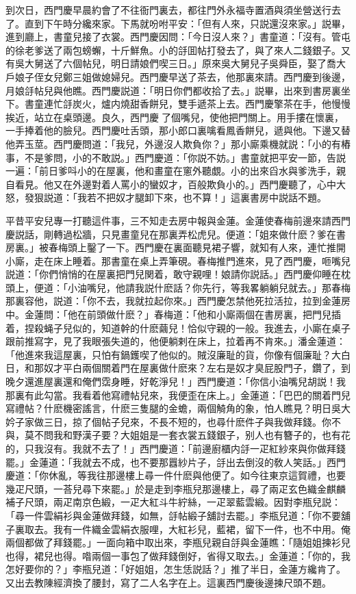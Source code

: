 到次日，西門慶早晨約會了不往衙門裏去，都往門外永福寺置酒與須坐營送行去了。直到下午時分纔來家。下馬就吩咐平安：「但有人來，只説還沒來家。」説畢，進到廳上，書童兒接了衣裳。西門慶因問：「今日沒人來？」書童道：「沒有。管屯的徐老爹送了兩包螃蠏，十斤鮮魚。小的㧱囬帖打發去了，與了來人二錢銀子。又有吳大舅送了六個帖兒，明日請娘們喫三日。」原來吳大舅兒子吳舜臣，娶了喬大戶娘子侄女兒鄭三姐做媳婦兒。西門慶早送了茶去，他那裏來請。西門慶到後邊，月娘㧱帖兒與他瞧。西門慶説道：「明日你們都收拾了去。」説畢，出來到書房裏坐下。書童連忙㧱炭火，爐内燒甜香餅兒，雙手遞茶上去。西門慶擎茶在手，他慢慢挨近，站立在桌頭邊。良久，西門慶𢫓了個嘴兒，使他把門關上。用手摟在懷裏，一手捧着他的臉兒。西門慶吐舌頭，那小郎口裏噙看鳳香餅兒，遞與他。下邊又替他弄玉莖。西門慶問道：「我兒，外邊沒人欺負你？」那小廝乘機就説：「小的有樁事，不是爹問，小的不敢説。」西門慶道：「你説不妨。」書童就把平安一節，告説一遍：「前日爹呌小的在屋裏，他和畫童在窻外聽覷。小的出來舀水與爹洗手，親自看見。他又在外邊對着人罵小的蠻奴才，百般欺負小的。」西門慶聽了，心中大怒，發狠説道：「我若不把奴才腿卸下來，也不算！」這裏書房中説話不題。

平昔平安兒專一打聽這件事，三不知走去房中報與金蓮。金蓮使春梅前邊來請西門慶説話，剛轉過松牆，只見畫童兒在那裏弄松虎兒。便道：「姐來做什麽？爹在書房裏。」被春梅頭上鑿了一下。西門慶在裏面聽見裙子響，就知有人來，連忙推開小廝，走在床上睡着。那書童在桌上弄筆硯。春梅推門進來，見了西門慶，咂嘴兒説道：「你們悄悄的在屋裏把門兒関着，敢守親哩！娘請你説話。」西門慶仰睡在枕頭上，便道：「小油嘴兒，他請我説什麽話？你先行，等我畧躺躺兒就去。」那春梅那裏容他，説道：「你不去，我就拉起你來。」西門慶怎禁他死拉活拉，拉到金蓮房中。金蓮問：「他在前頭做什麽？」春梅道：「他和小廝兩個在書房裏，把門兒插着，捏殺蝇子兒似的，知道幹的什麽繭兒！恰似守親的一般。我進去，小廝在桌子跟前推寫字，見了我眼張失道的，他便躺剌在床上，拉着再不肯來。」潘金蓮道：「他進來我這屋裏，只怕有鍋鑊喫了他似的。賊沒廉耻的貨，你像有個廉耻？大白日，和那奴才平白兩個關着門在屋裏做什麽來？左右是奴才臭屁股門子，鑽了，到晚夕還進屋裏還和俺們霑身睡，好乾淨兒！」西門慶道：「你信小油嘴兒胡説！我那裏有此勾當。我看着他寫禮帖兒來，我便歪在床上。」金蓮道：「巴巴的關着門兒寫禮帖？什麽機密謠言，什麽三隻腿的金蟾，兩個觭角的象，怕人瞧見？明日吳大妗子家做三日，掠了個帖子兒來，不長不短的，也尋什麽件子與我做拜錢。你不與，莫不問我和野漢子要？大姐姐是一套衣裳五錢銀子，别人也有簪子的，也有花的，只我沒有。我就不去了！」西門慶道：「前邊廚櫃内㧱一疋紅紗來與你做拜錢罷。」金蓮道：「我就去不成，也不要那囂紗片子，㧱出去倒沒的敎人笑話。」西門慶道：「你休亂，等我往那邊樓上尋一件什麽與他便了。如今往東京這賀禮，也要幾疋尺頭，一荅兒尋下來罷。」於是走到李瓶兒那邊樓上，尋了兩疋玄色織金麒麟補子尺頭，兩疋南京色緞，一疋大紅斗牛紵絲，一疋翠藍雲緞。因對李瓶兒説：「尋一件雲絹衫與金蓮做拜錢，如無，㧱帖緞子舖討去罷。」李瓶兒道：「你不要舖子裏取去。我有一件織金雲絹衣服哩，大紅衫兒，藍裙，留下一件，也不中用。俺兩個都做了拜錢罷。」一面向箱中取出來，李瓶兒親自㧱與金蓮瞧：「隨姐姐揀衫兒也得，裙兒也得。喒兩個一事包了做拜錢倒好，省得又取去。」金蓮道：「你的，我怎好要你的？」李瓶兒道：「好姐姐，怎生恁説話？」推了半日，金蓮方纔肯了。又出去教陳經濟換了腰封，寫了二人名字在上。這裏西門慶後邊揀尺頭不題。

